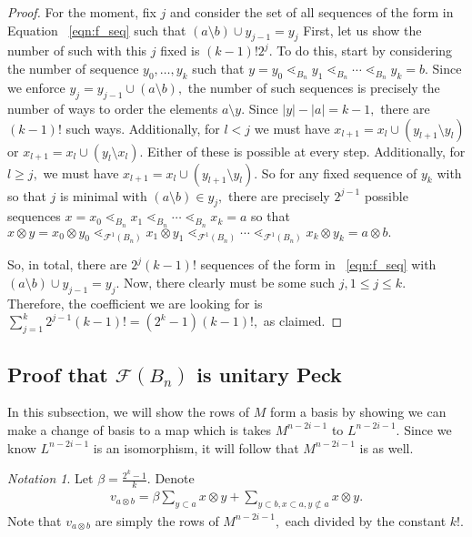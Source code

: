 \documentclass{amsart}
\theoremstyle{remark}
\newtheorem{note}[thm]{Notation}
\newcommand\ssec{\subsection}
\begin{document}
\begin{proof}
For the moment, fix $j$ and consider the set of all sequences of the form in Equation ~\eqref{eqn:f_seq} such that $(a\setminus b) \cup y_{j-1} = y_j$ First, let us show the number of such with this $j$ fixed is $(k-1)!2^j.$ To do this, start by considering the number of sequence $y_0,\ldots, y_k$ such that $y=y_0 \lessdot_{B_n} y_1 \lessdot_{B_n} \cdots \lessdot_{B_n} y_k = b.$ Since we enforce $y_j = y_{j-1} \cup (a \setminus b),$ the number of such sequences is precisely the number of ways to order the elements $a \setminus y.$ Since $|y| - |a| = k-1,$ there are $(k-1)!$ such ways. Additionally, for $l <j$ we must have $x_{l+1} = x_l \cup (y_{l+1} \setminus y_l)$ or $x_{l+1} = x_l \cup (y_l \setminus x_l).$ 
Either of these is possible at every step. Additionally, for $l \geq j,$ we must have $x_{l+1} = x_l \cup (y_{l+1} \setminus y_l).$ So for any fixed sequence of $y_k$ with so that $j$ is minimal with $(a\setminus b) \in y_j,$ 
there are precisely $2^{j-1}$ possible sequences $x=x_0 \lessdot_{B_n} x_1 \lessdot_{B_n} \cdots \lessdot_{B_n} x_k = a$
so that $x\otimes y = x_0\otimes y_0 \lessdot_{\mathcal F^1(B_n)} x_1 \otimes y_1 \lessdot_{\mathcal F^1(B_n)}  \cdots \lessdot_{\mathcal F^1(B_n)}  x_k \otimes y_k = a\otimes b.$

So, in total, there are $2^j(k-1)!$ sequences of the form in ~\eqref{eqn:f_seq} with $(a\setminus b) \cup y_{j-1} = y_j$. Now, there clearly must be some such $j,1 \leq j \leq k.$ Therefore, the coefficient we are looking for is $\sum_{j = 1}^k 2^{j-1}(k-1)! = (2^k - 1)(k-1)!,$ as claimed.

\end{proof}



\ssec{Proof that $\mathcal F(B_n)$ is unitary Peck}

In this subsection, we will show the rows of $M$ form a basis by showing we can make a change of basis to a map which is takes $M^{n-2i-1}$ to $L^{n-2i-1}.$ Since we know $L^{n-2i-1}$ is an isomorphism, it will follow that $M^{n-2i-1}$ is as well.

\begin{note}

Let $\beta = \frac{2^k-1}{k}.$ Denote 
\begin{align*}
	v_{a \otimes b} =\beta \sum_{y \subset a}^{}x \otimes y + \sum_{y\subset b,x \subset a,y\not\subset a}^{}x\otimes y.
\end{align*}
Note that $v_{a \otimes b}$ are simply the rows of $M^{n-2i-1},$ each divided by the constant $k!.$
\end{note}
\end{document}
